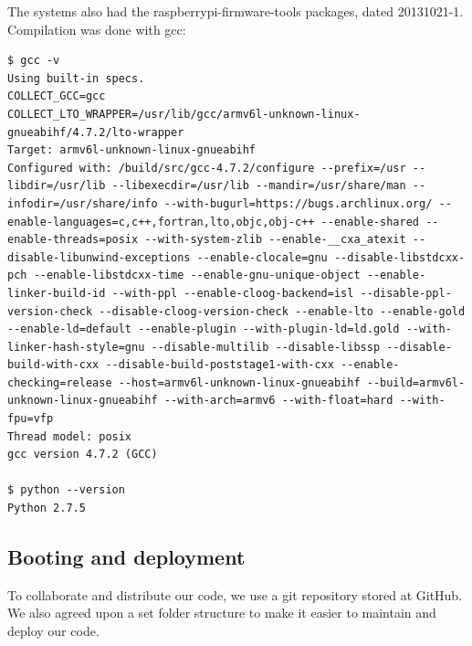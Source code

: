 The systems also had the raspberrypi-firmware-tools packages, dated 20131021-1. Compilation was done with gcc:
\begin{lstlisting}[captionpos=b,caption={Output of {\tt gcc -v} and {\tt python --version}}]
$ gcc -v
Using built-in specs.
COLLECT_GCC=gcc
COLLECT_LTO_WRAPPER=/usr/lib/gcc/armv6l-unknown-linux-gnueabihf/4.7.2/lto-wrapper
Target: armv6l-unknown-linux-gnueabihf
Configured with: /build/src/gcc-4.7.2/configure --prefix=/usr --libdir=/usr/lib --libexecdir=/usr/lib --mandir=/usr/share/man --infodir=/usr/share/info --with-bugurl=https://bugs.archlinux.org/ --enable-languages=c,c++,fortran,lto,objc,obj-c++ --enable-shared --enable-threads=posix --with-system-zlib --enable-__cxa_atexit --disable-libunwind-exceptions --enable-clocale=gnu --disable-libstdcxx-pch --enable-libstdcxx-time --enable-gnu-unique-object --enable-linker-build-id --with-ppl --enable-cloog-backend=isl --disable-ppl-version-check --disable-cloog-version-check --enable-lto --enable-gold --enable-ld=default --enable-plugin --with-plugin-ld=ld.gold --with-linker-hash-style=gnu --disable-multilib --disable-libssp --disable-build-with-cxx --disable-build-poststage1-with-cxx --enable-checking=release --host=armv6l-unknown-linux-gnueabihf --build=armv6l-unknown-linux-gnueabihf --with-arch=armv6 --with-float=hard --with-fpu=vfp
Thread model: posix
gcc version 4.7.2 (GCC) 

$ python --version
Python 2.7.5
\end{lstlisting}

\subsection{Booting and deployment}
To collaborate and distribute our code, we use a git repository stored at GitHub. We also agreed upon a set folder structure to make it easier to maintain and deploy our code.

